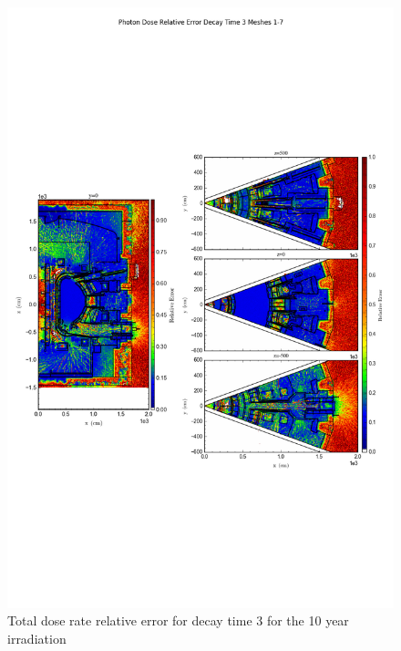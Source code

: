 \documentclass[12pt]{article}
\begin{document}
\begin{figure}[ht!]
\centering
\includegraphics[trim={0cm 8cm, 0cm 8cm},clip,scale=0.75]{../plots/final_model/10year/Photon_Dose_Relative_Error_Decay_Time_3_Meshes_1-7.png}
\caption{Total dose rate relative error for decay time 3 for the 10 year irradiation}
\label{fig:photons_10y_dc3_nob4c_relerr}
\end{figure}
\end{document}
